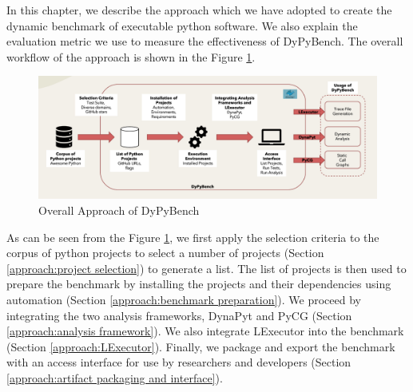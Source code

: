 In this chapter, we describe the approach which we have adopted to create the dynamic benchmark of executable python software.
We also explain the evaluation metric we use to measure the effectiveness of DyPyBench.
The overall workflow of the approach is shown in the Figure \ref{fig:overall_approach}.

\begin{figure}[ht]
\centering
\includegraphics[width=1\linewidth]{figures/approach/DyPyBench3.png}
\caption[Approach]{\label{fig:overall_approach}Overall Approach of DyPyBench}
\end{figure}

As can be seen from the Figure \ref{fig:overall_approach}, we first apply the selection criteria to the corpus of python projects to select a number of projects (Section \ref{approach:project selection}) to generate a list.
The list of projects is then used to prepare the benchmark by installing the projects and their dependencies using automation (Section \ref{approach:benchmark preparation}).
We proceed by integrating the two analysis frameworks, DynaPyt and PyCG (Section \ref{approach:analysis framework}). 
We also integrate LExecutor into the benchmark (Section \ref{approach:LExecutor}).
Finally, we package and export the benchmark with an access interface for use by researchers and developers (Section \ref{approach:artifact packaging and interface}).   

